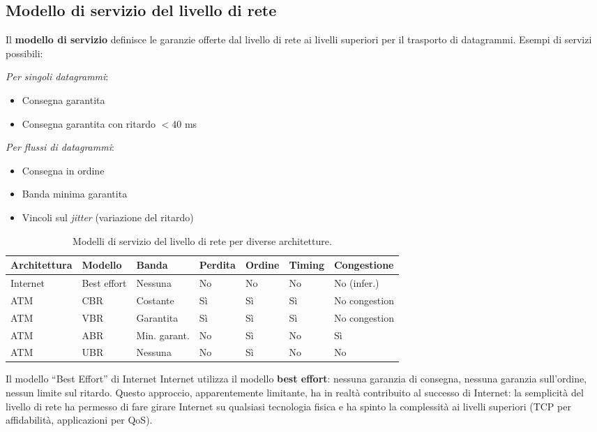 \documentclass[a4paper,12pt]{report}
\begin{document}
\newpage
\subsection{Modello di servizio del livello di rete}

Il \textbf{modello di servizio} definisce le garanzie offerte dal livello di rete ai livelli superiori per il trasporto di datagrammi. Esempi di servizi possibili:

\textit{Per singoli datagrammi}:
\begin{itemize}
    \item Consegna garantita
    \item Consegna garantita con ritardo $< 40$ ms
\end{itemize}

\textit{Per flussi di datagrammi}:
\begin{itemize}
    \item Consegna in ordine
    \item Banda minima garantita
    \item Vincoli sul \textit{jitter} (variazione del ritardo)
\end{itemize}

\begin{table}[H]
\centering
\caption{Modelli di servizio del livello di rete per diverse architetture.}
\label{tab:service-models}
\begin{tabular}{lllllll}
\toprule
\textbf{Architettura} & \textbf{Modello} & \textbf{Banda} & \textbf{Perdita} & \textbf{Ordine} & \textbf{Timing} & \textbf{Congestione} \\
\midrule
Internet & Best effort & Nessuna & No & No & No & No (infer.) \\
ATM & CBR & Costante & Sì & Sì & Sì & No congestion \\
ATM & VBR & Garantita & Sì & Sì & Sì & No congestion \\
ATM & ABR & Min. garant. & No & Sì & No & Sì \\
ATM & UBR & Nessuna & No & Sì & No & No \\
\bottomrule
\end{tabular}
\end{table}

\begin{urgentbox}{Il modello ``Best Effort'' di Internet}
Internet utilizza il modello \textbf{best effort}: nessuna garanzia di consegna, nessuna garanzia sull'ordine, nessun limite sul ritardo. Questo approccio, apparentemente limitante, ha in realtà contribuito al successo di Internet: la semplicità del livello di rete ha permesso di fare girare Internet su qualsiasi tecnologia fisica e ha spinto la complessità ai livelli superiori (TCP per affidabilità, applicazioni per QoS).
\end{urgentbox}
\end{document}
